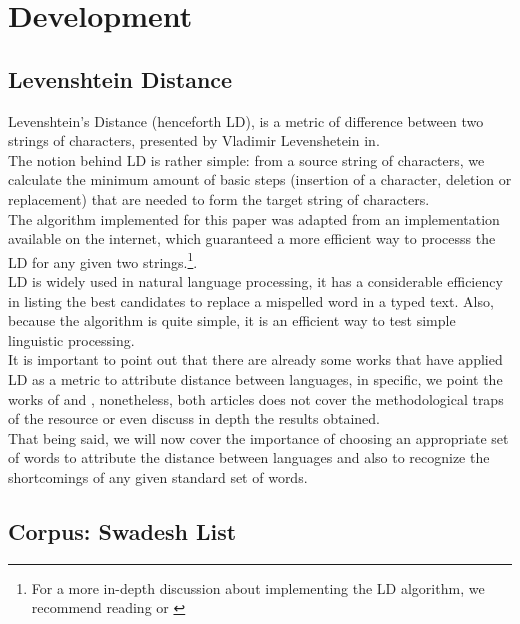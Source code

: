 \documentclass[runningheads]{llncs}
\begin{document}
\section{Development}
\subsection{Levenshtein Distance}

Levenshtein's Distance (henceforth LD), is a metric of difference between two strings of characters, presented by Vladimir Levenshetein in\cite{levenshtein1966binary}.\\

The notion behind LD is rather simple: from a source string of characters, we calculate the minimum amount of basic steps (insertion of a character, deletion or replacement) that are needed to form the target string of characters.\\

The algorithm implemented for this paper was adapted from an implementation available on the internet, which guaranteed a more efficient way to processs the LD for any given two strings.\footnote{For a more in-depth discussion about implementing the LD algorithm, we recommend reading \cite{jurafsky2000} or \cite{navarro2001guided}}.\\

LD is widely used in natural language processing, it has a considerable efficiency in listing the best candidates to replace a mispelled word in a typed text. Also, because the algorithm is quite simple, it is an efficient way to test simple linguistic processing.\\

It is important to point out that there are already some works that have applied LD as a metric to attribute distance between languages, in specific, we point the works of \cite{serva2008indo} and \cite{petroni2008language}, nonetheless, both articles does not cover the methodological traps of the resource or even discuss in depth the results obtained.\\

That being said, we will now cover the importance of choosing an appropriate set of words to attribute the distance between languages and also to recognize the shortcomings of any given standard set of words.\\


\subsection{Corpus: Swadesh List}
\end{document}
